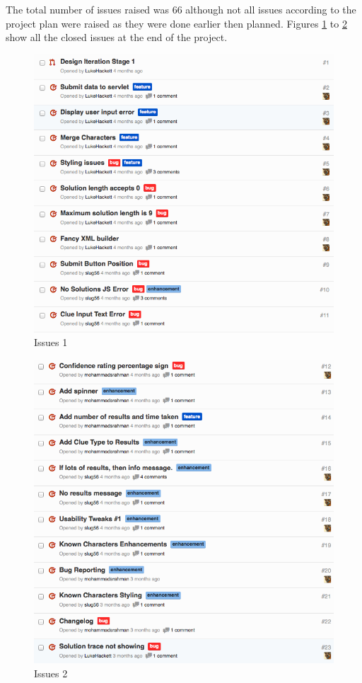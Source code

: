 The total number of issues raised was 66 although not all issues according to
the project plan were raised as they were done earlier then planned. Figures
\ref{fig:issues1} to \ref{fig:issues2} show all the closed issues at the end of
the project.

\begin{figure}[H]
  \centering
  \includegraphics[width=\linewidth]{images/issues1.png}
  \caption{Issues 1}
  \label{fig:issues1}
\end{figure}

\begin{figure}[H]
  \centering
  \includegraphics[width=\linewidth]{images/issues2.png}
  \caption{Issues 2}
  \label{fig:issues2}
\end{figure}

